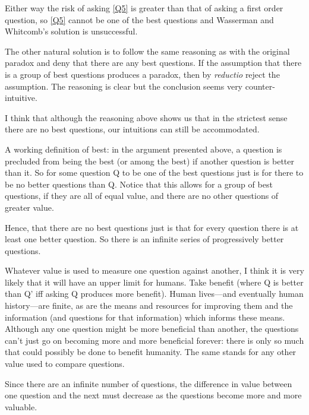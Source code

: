 Either way the risk of asking \ref{Q5} is greater than that of asking a first order question, so \ref{Q5} cannot be one of the best questions and Wasserman and Whitcomb's solution is unsuccessful.

The other natural solution is to follow the same reasoning as with the original paradox and deny that there are any best questions.
If the assumption that there is a group of best questions produces a paradox, then by \textit{reductio} reject the assumption.
The reasoning is clear but the conclusion seems very counter-intuitive.

I think that although the reasoning above shows us that in the strictest sense there are no best questions, our intuitions can still be accommodated.

A working definition of best: in the argument presented above, a question is precluded from being the best (or among the best) if another question is better than it.
So for some question Q to be one of the best questions just is for there to be no better questions than Q.
Notice that this allows for a group of best questions, if they are all of equal value, and there are no other questions of greater value.

Hence, that there are no best questions just is that for every question there is at least one better question.
So there is an infinite series of progressively better questions.

Whatever value is used to measure one question against another, I think it is very likely that it will have an upper limit for humans.
Take benefit (where Q is better than Q' iff asking Q produces more benefit).
Human lives---and eventually human history---are finite, as are the means and resources for improving them and the information (and questions for that information) which informs these means.
Although any one question might be more beneficial than another, the questions can't just go on becoming more and more beneficial forever: there is only so much that could possibly be done to benefit humanity.
The same stands for any other value used to compare questions.

Since there are an infinite number of questions, the difference in value between one question and the next must decrease as the questions become more and more valuable.

